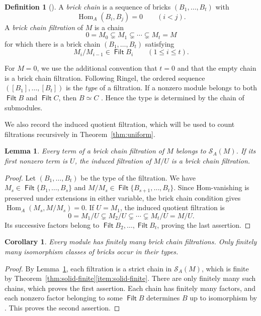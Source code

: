 \documentclass[a4paper,reqno,10pt]{amsart}
\newtheorem{lemma}[theorem]{Lemma}
\newtheorem{corollary}[theorem]{Corollary}
\theoremstyle{definition}
\newtheorem{definition}[theorem]{Definition}
\numberwithin{equation}{section}
\newcommand{\Hom}{\operatorname{Hom}}
\DeclareMathOperator{\Filt}{\mathsf{Filt}}
\newcommand{\Sol}{\mathcal S}
\begin{document}
\begin{definition}[{\cite[Section~1.1]{RingelFiltrations}}]\label{def:bcf}
A \emph{brick chain} is a sequence of bricks $(B_1,\ldots,B_t)$ with
\[
 \Hom_A(B_i,B_j)=0\qquad(i<j).
\]
A \emph{brick chain filtration} of $M$
is a chain
\[
 0=M_0\subsetneq M_1\subsetneq\cdots\subsetneq M_t=M
\]
for which there is a brick chain $(B_1,\ldots,B_t)$ satisfying
\[
 M_i/M_{i-1}\in\Filt B_i\qquad(1\leq i\leq t).
\]
\end{definition}

For $M=0$, we use the additional convention that $t=0$ and that the
empty chain is a brick chain filtration. Following Ringel, the ordered
sequence $([B_1],\ldots,[B_t])$ is the \emph{type} of a filtration.
If a nonzero module belongs to both $\Filt B$ and $\Filt C$, then $B\simeq C$
\cite[Lemma~9.7]{RingelFiltrations}. Hence the type is determined by the
chain of submodules.

We also record the induced quotient filtration, which will be used to
count filtrations recursively in Theorem~\ref{thm:uniform}.

\begin{lemma}\label{lem:filtration-solid}
Every term of a brick chain filtration of $M$ belongs to $\Sol_A(M)$.
If its first nonzero term is $U$, the induced filtration of $M/U$ is a
brick chain filtration.
\end{lemma}

\begin{proof}
Let $(B_1,\ldots,B_t)$ be the type of the filtration. We have
$M_s\in\Filt\{B_1,\ldots,B_s\}$ and
$M/M_s\in\Filt\{B_{s+1},\ldots,B_t\}$.
Since Hom-vanishing is preserved under extensions in either variable,
the brick chain condition gives
$\Hom_A(M_s,M/M_s)=0$.
If $U=M_1$, the induced quotient filtration is
\[
 0=M_1/U\subsetneq M_2/U\subsetneq\cdots\subsetneq M_t/U=M/U.
\]
Its successive factors belong to
$\Filt B_2,\ldots,\Filt B_t$, proving the last assertion.
\end{proof}

\begin{corollary}\label{cor:bcf-finite}
Every module has finitely many brick chain filtrations. Only finitely
many isomorphism classes of bricks occur in their types.
\end{corollary}

\begin{proof}
By Lemma~\ref{lem:filtration-solid}, each filtration is a strict chain
in $\Sol_A(M)$, which is finite by
Theorem~\ref{thm:solid-finite}\ref{item:solid-finite}. There are only finitely many such
chains, which proves the first assertion. Each chain has finitely many
factors, and each nonzero factor belonging to some $\Filt B$ determines
$B$ up to isomorphism by \cite[Lemma~9.7]{RingelFiltrations}.
This proves the second assertion.
\end{proof}
\end{document}
